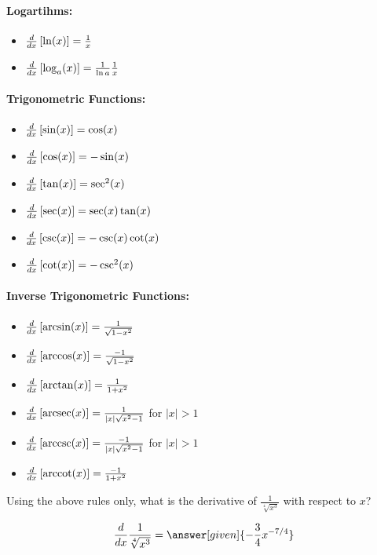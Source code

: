 \documentclass[nooutcomes]{ximera}
\begin{document}
\paragraph{Logartihms:}
\begin{itemize}
\item $\frac{d}{\mathop{}\!d x} \left[ \ln(x) \right]= \frac{1}{x}$
\item $\frac{d}{\mathop{}\!d x} \left[ \log_a (x)\right] = \frac{1}{\ln a} \frac{1}{x}$
\end{itemize}

\paragraph{Trigonometric Functions:}
\begin{itemize}
\item $\frac{d}{\mathop{}\!d x} \left[ \sin(x)\right] = \cos(x)$
\item $\frac{d}{\mathop{}\!d x} \left[ \cos(x)\right] = -\sin(x)$  
\item $\frac{d}{\mathop{}\!d x} \left[ \tan(x) \right]= \sec^2(x)$  
\item $\frac{d}{\mathop{}\!d x} \left[ \sec(x)\right]= \sec(x)\tan(x)$ 
\item $\frac{d}{\mathop{}\!d x} \left[ \csc(x)\right] = -\csc(x)\cot(x)$
\item $\frac{d}{\mathop{}\!d x} \left[ \cot(x) \right]= -\csc^2(x)$
\end{itemize}

\paragraph{Inverse Trigonometric Functions:}
\begin{itemize}
\item $\frac{d}{\mathop{}\!d x} \left[ \arcsin(x)\right] = \frac{1}{\sqrt{1-x^2}}$
\item $\frac{d}{\mathop{}\!d x} \left[ \arccos(x) \right]= \frac{-1}{\sqrt{1-x^2}}$
\item $\frac{d}{\mathop{}\!d x} \left[ \arctan(x) \right]=\frac{1}{1+x^2}$
\item $\frac{d}{\mathop{}\!d x} \left[ \operatorname{arcsec}(x)\right] = \frac{1}{|x|\sqrt{x^2-1}}$ for $|x|>1$
\item $\frac{d}{\mathop{}\!d x} \left[ \operatorname{arccsc}(x)\right] = \frac{-1}{|x|\sqrt{x^2-1}}$ for $|x|>1$
\item $\frac{d}{\mathop{}\!d x} \left[ \operatorname{arccot}(x) \right]= \frac{-1}{1+x^2}$
\end{itemize}



\begin{question} 
  Using the above rules only, what is the derivative of $\frac{1}{\sqrt[4]{x^3}}$ with respect to $x$?
  \begin{prompt} 
    \[
    \ddx \frac{1}{\sqrt[4]{x^3}} = \answer[given]{- \frac{3}{4} x^{-7/4}}
    \]
  \end{prompt}
\end{question}
\end{document}
